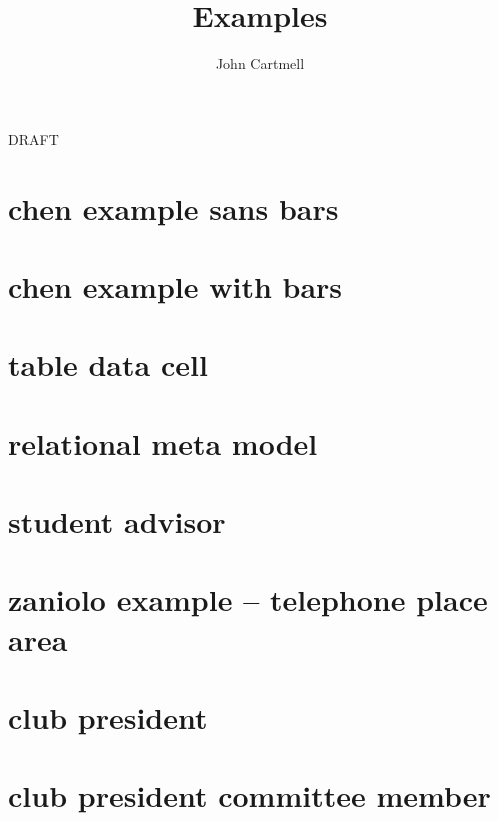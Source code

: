 \documentclass[10pt,a4paper]{article}
\begin{document}
\title{Examples}


\author{John Cartmell}

\maketitle
\begin{center}
DRAFT
\end{center}

\section{chen example sans bars}


\section{chen example with bars}


\section{table data cell}


\section{relational meta model}


\section{student advisor}


\section{zaniolo example -- telephone place area}


\section{club president}


\section{club president committee member}

\end{document}

